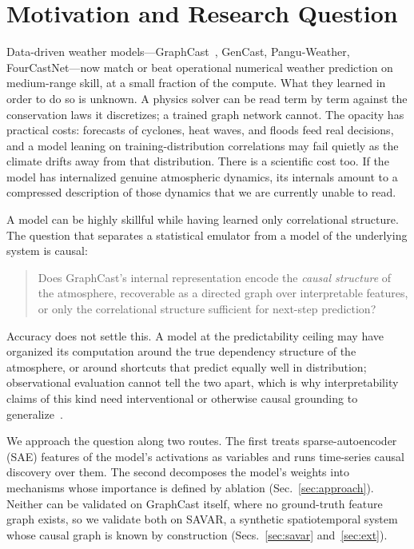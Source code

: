 \section{Motivation and Research Question}
\label{sec:intro}

Data-driven weather models---GraphCast~\cite{graphcast}, GenCast, Pangu-Weather,
FourCastNet---now match or beat operational numerical weather prediction on
medium-range skill, at a small fraction of the compute. What they learned in order
to do so is unknown. A physics solver can be read term by term against the
conservation laws it discretizes; a trained graph network cannot. The opacity has
practical costs: forecasts of cyclones, heat waves, and floods feed real decisions,
and a model leaning on training-distribution correlations may fail quietly as the
climate drifts away from that distribution. There is a scientific cost too. If the
model has internalized genuine atmospheric dynamics, its internals amount to a
compressed description of those dynamics that we are currently unable to read.

A model can be highly skillful while having learned only correlational structure.
The question that separates a statistical emulator from a model of the underlying
system is causal:

\begin{quote}
Does GraphCast's internal representation encode the \emph{causal structure} of the
atmosphere, recoverable as a directed graph over interpretable features, or only
the correlational structure sufficient for next-step prediction?
\end{quote}

Accuracy does not settle this. A model at the predictability ceiling may have
organized its computation around the true dependency structure of the atmosphere,
or around shortcuts that predict equally well in distribution; observational
evaluation cannot tell the two apart, which is why interpretability claims of this
kind need interventional or otherwise causal grounding to
generalize~\cite{joshi2026}.

We approach the question along two routes. The first treats sparse-autoencoder
(SAE) features of the model's activations as variables and runs time-series causal
discovery over them. The second decomposes the model's weights into mechanisms
whose importance is defined by ablation (Sec.~\ref{sec:approach}). Neither can be
validated on GraphCast itself, where no ground-truth feature graph exists, so we
validate both on SAVAR, a synthetic spatiotemporal system whose causal graph is
known by construction (Secs.~\ref{sec:savar} and~\ref{sec:ext}).

